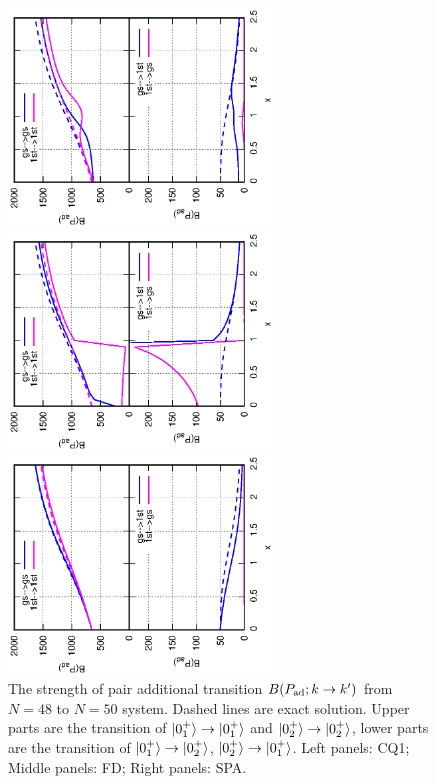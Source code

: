 \documentclass[%
superscriptaddress,
preprint,
showpacs,
nofootinbib,
amsmath,amssymb,
prc,
floatfix ]%
{revtex4-1}
\begin{document}
\begin{figure}[htbp]
 \begin{minipage}{0.3\hsize}
 \begin{center}
  \includegraphics[width=70mm,angle=-90]{images/N50Pad_CQ.eps}
 \end{center}
 \captionsetup{labelformat=empty,labelsep=none}
 \end{minipage}
 \begin{minipage}{0.3\hsize}
 \begin{center}
  \includegraphics[width=70mm,angle=-90]{images/N50Pad_FD.eps}
 \end{center}
 \captionsetup{labelformat=empty,labelsep=none}
 \end{minipage}
 \begin{minipage}{0.3\hsize}
 \begin{center}
  \includegraphics[width=70mm,angle=-90]{images/N50Pad_SPA.eps}
 \end{center}
 \captionsetup{labelformat=empty,labelsep=none}
 \end{minipage}
 \caption{The strength of pair additional transition $B(P_{\rm ad};k\rightarrow k')$ from $N=48$ to $N=50$ system. Dashed lines are exact solution. Upper parts are the transition of $\ket{0_1^+}\to\ket{0_1^+}$ and $\ket{0_2^+}\to\ket{0_2^+}$, lower parts are the transition of $\ket{0_1^+}\to\ket{0_2^+}$, $\ket{0_2^+}\to\ket{0_1^+}$. Left panels: CQ1; Middle panels: FD; Right panels: SPA.}
 \label{fig:N50Pad}
\end{figure}
\end{document}
